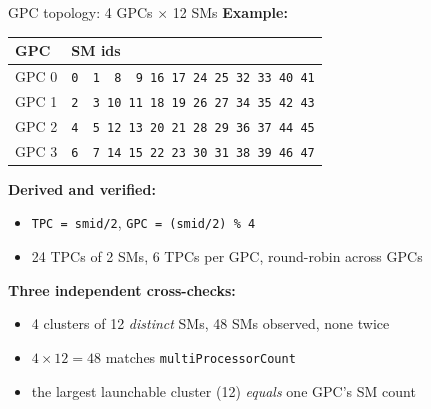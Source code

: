 \documentclass[aspectratio=169, numbering=fraction]{beamer}
\begin{document}
\begin{frame}{GPC topology: 4 GPCs $\times$ 12 SMs}
  \footnotesize
  \textbf{Example:}\vspace{-0.3em}

  \centering
  \begin{tabular}{ll}
    \toprule
    \textbf{GPC} & \textbf{SM ids} \\
    \midrule
    GPC 0 & \texttt{0\ \ 1\ \ 8\ \ 9\ 16\ 17\ 24\ 25\ 32\ 33\ 40\ 41} \\
    GPC 1 & \texttt{2\ \ 3\ 10\ 11\ 18\ 19\ 26\ 27\ 34\ 35\ 42\ 43} \\
    GPC 2 & \texttt{4\ \ 5\ 12\ 13\ 20\ 21\ 28\ 29\ 36\ 37\ 44\ 45} \\
    GPC 3 & \texttt{6\ \ 7\ 14\ 15\ 22\ 23\ 30\ 31\ 38\ 39\ 46\ 47} \\
    \bottomrule
  \end{tabular}

  \raggedright
  \footnotesize
  \vspace{0.2em}
  \textbf{Derived and verified:}\vspace{-0.3em}
  \begin{itemize}\itemsep0pt
    \item \texttt{TPC = smid/2}, \quad \texttt{GPC = (smid/2) \% 4}
    \item 24 TPCs of 2 SMs, 6 TPCs per GPC, round-robin across GPCs
  \end{itemize}

  \textbf{Three independent cross-checks:}\vspace{-0.3em}
  \begin{itemize}\itemsep0pt
    \item 4 clusters of 12 \emph{distinct} SMs, 48 SMs observed, none twice
    \item $4 \times 12 = 48$ matches \texttt{multiProcessorCount}
    \item the largest launchable cluster (12) \emph{equals} one GPC's SM count
  \end{itemize}
\end{frame}
\end{document}
